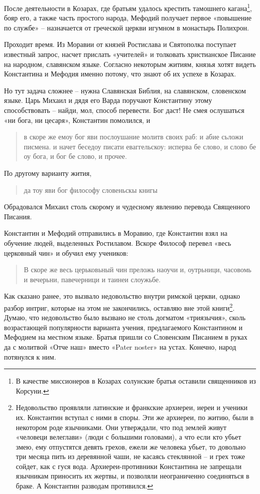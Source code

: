 После деятельности в Козарах, где братьям удалось крестить тамошнего кагана\footnote{В качестве миссионеров в Козарах солунские братья оставили священников из Корсуни.}, бояр его, а также часть простого народа, Мефодий получает первое «повышение по службе» – назначается от греческой церкви игумном в монастырь Полихрон.

Проходит время. Из Моравии от князей Ростислава и Святополка поступает известный запрос, насчет прислать «учителей» и толковать христианское Писание на народном, славянском языке. Согласно некоторым житиям, князья хотят видеть Константина и Мефодия именно потому, что знают об их успехе в Козарах.

Но тут задача сложнее – нужна Славянская Библия, на славянском, словенском языке. Царь Михаил и дядя его Варда поручают Константину этому способствовать – найди, мол, способ перевести. Бог даст! Не смея ослушаться «ни бога, ни цесаря», Константин помолился, и 

\begin{quotation}
в скоре же емоу бог яви послоушание молитв своих раб: и абие сьложи писмена. и начет беседоу писати еваггельскоу: исперва бе слово, и слово бе оу бога, и бог бе слово, и прочее.
\end{quotation}

По другому варианту жития,

\begin{quotation}
да тоу яви бог философу словеньскы книгы
\end{quotation}

Обрадовался Михаил столь скорому и чудесному явлению перевода Священного Писания.

Константин и Мефодий отправились в Моравию, где Константин взял на обучение людей, выделенных Ростилавом. Вскоре Философ перевел «весь церковный чин» и обучил ему учеников:

\begin{quotation}
В скоре же весь церьковьный чин преложь наоучи и, оутрьници, часовомь и вечерьни, павечерници и таинеи слоужьбе.
\end{quotation}

Как сказано ранее, это вызвало недовольство внутри римской церкви, однако разбор интриг, которые на этом не закончились, оставляю вне этой книги\footnote{Недовольство проявляли латинские и франкские архиереи, иереи и ученики их. Константин вступал с ними в споры. Эти же архиереи, по житию, были в некотором роде язычниками. Они утверждали, что под землей живут «человеци велеглави» (люди с большими головами), а что если кто убьет змею, ему отпустятся девять грехов, ежели же человека убьет, то довольно три месяца пить из деревянной чаши, не касаясь стеклянной – и грех тоже сойдет, как с гуся вода. Архиереи-противники Константина не запрещали язычникам приносить их жертвы, и позволяли неограниченно соединяться в браке. А Константин разводам противился.}. Думаю, что недовольство было вызвано не столь догматом «триязычия», сколь возрастающей популярности варианта учения, предлагаемого Константином и Мефодием на местном языке. Братья пришли со Словенским Писанием в руках да с молитвой «Отче наш» вместо «Pater noster» на устах. Конечно, народ потянулся к ним.

